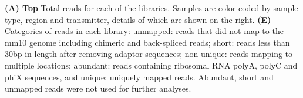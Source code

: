 \textbf{(A) Top} Total reads for each of the libraries. Samples are color coded by sample type, region and transmitter, details of which are shown on the right. 
\textbf{(E)} Categories of reads in each library: unmapped: reads that did not map to the mm10 genome including chimeric and back-spliced reads; short: reads less than 30bp in length after removing adaptor sequences; non-unique: reads mapping to multiple locations; abundant: reads containing ribosomal RNA polyA, polyC and phiX sequences, and unique: uniquely mapped reads. Abundant, short and unmapped reads were not used for further analyses. 
